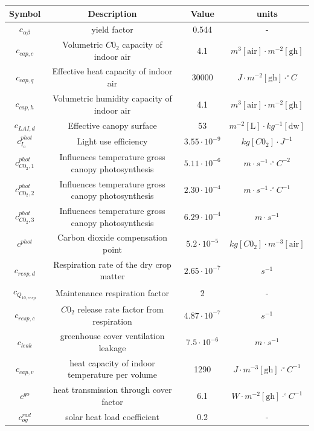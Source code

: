 \begin{table}[H]
	\centering
	\begin{tabular}{|c|c|c|c|}
		\hline
		Symbol & Description & Value & units 
		\\ \hline
		$c_{\alpha \beta}$& yield factor &0.544 &-
		\\
		$c_{cap,c}$& Volumetric $C0_2$ capacity of indoor air & 4.1& $m^3 [\text{air}] \cdot m^{-2} [\text{gh}]$
		\\
		$c_{cap,q}$& Effective heat capacity of indoor air &30000 & $J \cdot m^{-2} [\text{gh}] \cdot ^{\circ}C$
		\\
		$c_{cap,h}$&Volumetric humidity  capacity of indoor air & 4.1& $m^3 [\text{air}] \cdot m^{-2} [\text{gh}]$
		\\
		$c_{LAI,d}$&Effective canopy surface & 53& $m^{-2} [\text{L}] \cdot kg^{-1} [\text{dw}]$
		\\
		$c_{I_o}^{phot}$&Light use efficiency & $3.55 \cdot 10^{-9}$& $kg [C0_2] \cdot J^{-1}$
		\\
		$c_{C0_2,1}^{phot}$& Influences temperature gross canopy photosynthesis& $5.11 \cdot 10^{-6}$ & $m \cdot s^{-1} \cdot ^\circ C^{-2}$
		\\
		$c_{C0_2,2}^{phot}$& Influences temperature gross canopy photosynthesis& $2.30 \cdot 10^{-4}$& $m \cdot s^{-1} \cdot ^\circ C^{-1}$
		\\
		$c_{C0_2,3}^{phot}$&Influences temperature gross canopy photosynthesis &$6.29 \cdot 10^{-4}$ &$m \cdot s^{-1}$
		\\
		$c^{phot}$& Carbon dioxide compensation point &$5.2 \cdot 10^{-5}$ &$kg [C0_2] \cdot m^{-3} [\text{air}]$
		\\
		$c_{resp,d}$&Respiration rate of the dry crop matter & $2.65 \cdot 10^{-7}$& $s^{-1}$
		\\
		$c_{Q_{10,resp}}$& Maintenance respiration factor &2 &-
		\\
		$c_{resp,c}$& $C0_2$ release rate factor from respiration &$4.87 \cdot 10^{-7}$ & $s^{-1}$
		\\
		$c_{leak}$& greenhouse cover ventilation leakage&$7.5 \cdot 10^{-6}$ & $m \cdot s^{-1}$
		\\
		$c_{cap,v}$& heat capacity of indoor temperature per volume & 1290 & $J \cdot m^{-3} [\text{gh}] \cdot ^\circ C^{-1}$
		\\
		$c^{go}$& heat transmission through cover factor &6.1 &$W \cdot m^{-2} [\text{gh}] \cdot ^\circ C^{-1}$
		\\
		$c_{og}^{rad}$&solar heat load coefficient & 0.2&-

\end{tabular}
\end{table}
